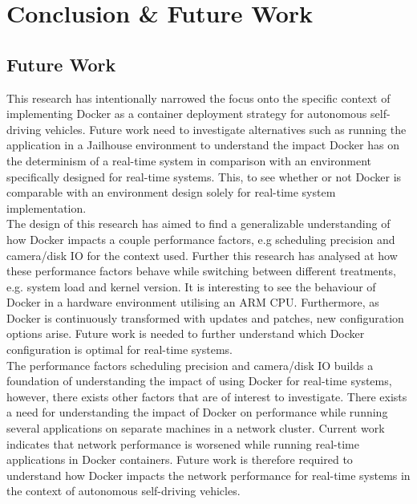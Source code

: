 \iffalse  \fi
\chapter{Conclusion \& Future Work} \label{section:conclusion}


\section{Future Work}

This research has intentionally narrowed the focus onto the specific context of implementing Docker as a container deployment strategy for autonomous self-driving vehicles. Future work need to investigate alternatives such as running the application in a Jailhouse environment to understand the impact Docker has on the determinism of a real-time system in comparison with an environment specifically designed for real-time systems. This, to see whether or not Docker is comparable with an environment design solely for real-time system implementation.\\

The design of this research has aimed to find a generalizable understanding of how Docker impacts a couple performance factors, e.g scheduling precision and camera/disk IO for the context used. Further this research has analysed at how these performance factors behave while switching between different treatments, e.g. system load and kernel version. It is interesting to see the behaviour of Docker in a hardware environment utilising an ARM CPU. Furthermore, as Docker is continuously transformed with updates and patches, new configuration options arise. Future work is needed to further understand which Docker configuration is optimal for real-time systems.\\

The performance factors scheduling precision and camera/disk IO builds a foundation of understanding the impact of using Docker for real-time systems, however, there exists other factors that are of interest to investigate. There exists a need for understanding the impact of Docker on performance while running several applications on separate machines in a network cluster. Current work \cite{conf/cloudcom/MaoHPWCCH15} indicates that network performance is worsened while running real-time applications in Docker containers. Future work is therefore required to understand how Docker impacts the network performance for real-time systems in the context of autonomous self-driving vehicles.\\



